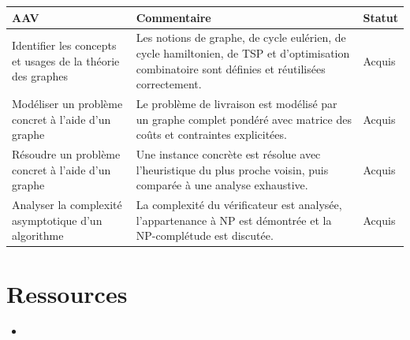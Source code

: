 \begin{center}
\setlength{\tabcolsep}{10pt}

\begin{tabular}{|p{}|p{}|m{}|}
\hline
\textbf{AAV} & \textbf{Commentaire} & \textbf{Statut} \\ \hline

Identifier les concepts et usages de la théorie des graphes &
Les notions de graphe, de cycle eulérien, de cycle hamiltonien, de TSP et d'optimisation combinatoire sont définies et réutilisées correctement. &
{\color{green!60!black}Acquis} \\ \hline

Modéliser un problème concret à l’aide d’un graphe &
Le problème de livraison est modélisé par un graphe complet pondéré avec matrice des coûts et contraintes explicitées. &
{\color{green!60!black}Acquis} \\ \hline

Résoudre un problème concret à l’aide d’un graphe &
Une instance concrète est résolue avec l’heuristique du plus proche voisin, puis comparée à une analyse exhaustive. &
{\color{green!60!black}Acquis} \\ \hline

Analyser la complexité asymptotique d'un algorithme &
La complexité du vérificateur est analysée, l’appartenance à NP est démontrée et la NP-complétude est discutée. &
{\color{green!60!black}Acquis} \\ \hline

\end{tabular}

\end{center}

\newpage

\section*{Ressources}

\begin{itemize}
	\item 
\end{itemize}
